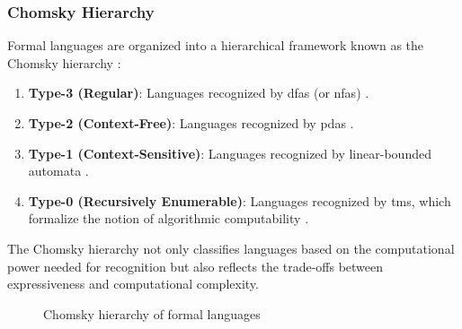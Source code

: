 \subsubsection{Chomsky Hierarchy}
Formal languages are organized into a hierarchical framework known as the Chomsky hierarchy \cite{chomsky1956three, hopcroft2006introduction}:
\begin{enumerate}
    \item \textbf{Type-3 (Regular)}: Languages recognized by \glspl{dfa} (or \glspl{nfa}) \cite{hopcroft2006introduction}.
    \item \textbf{Type-2 (Context-Free)}: Languages recognized by \glspl{pda} \cite{chomsky1956three}.
    \item \textbf{Type-1 (Context-Sensitive)}: Languages recognized by linear-bounded automata \cite{chomsky1956three}.
    \item \textbf{Type-0 (Recursively Enumerable)}: Languages recognized by \glspl{tm}, which formalize the notion of algorithmic computability \cite{hopcroft2006introduction, turing1936computable}.
\end{enumerate}

\begin{concept}
The Chomsky hierarchy not only classifies languages based on the computational power needed for recognition but also reflects the trade-offs between expressiveness and computational complexity.
\end{concept}

\begin{figure}[h]
    \centering
    \caption{Chomsky hierarchy of formal languages}
    \label{fig:chomsky-hierarchy}
\end{figure}

